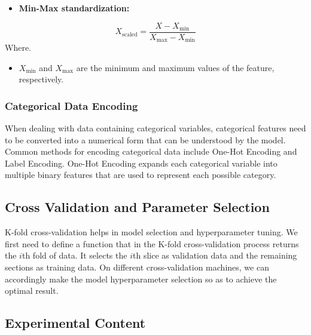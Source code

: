 \documentclass[a4paper,12pt]{article}
\begin{document}
\begin{itemize}
\item \textbf{Min-Max standardization:}
\end{itemize}
\[ X_{\text{scaled}} = \frac{X - X_{\text{min}}}{X_{\text{max}} - X_{\text{min}}} \]
Where.
\begin{itemize}
    \item \( X_{\text{min}} \) and \( X_{\text{max}} \) are the minimum and maximum values of the feature, respectively.
\end{itemize}

\subsubsection{Categorical Data Encoding}
When dealing with data containing categorical variables, categorical features need to be converted into a numerical form that can be understood by the model. Common methods for encoding categorical data include One-Hot Encoding and Label Encoding. One-Hot Encoding expands each categorical variable into multiple binary features that are used to represent each possible category.

\subsection{Cross Validation and Parameter Selection}
K-fold cross-validation helps in model selection and hyperparameter tuning. We first need to define a function that in the
K-fold cross-validation process returns the $i$th fold of data. It selects the $i$th slice as validation data and the remaining
sections as training data. On different cross-validation machines, we can accordingly make the model hyperparameter
selection so as to achieve the optimal result.

\subsection{Experimental Content}
\end{document}
